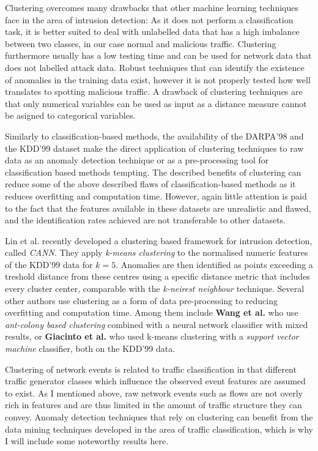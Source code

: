 \documentclass[a4paper,12pt,twoside]{report}
\begin{document}
Clustering overcomes many drawbacks that other machine learning techniques face in the area of intrusion detection: As it does not perform a classification task, it is better suited to deal with unlabelled data that has a high imbalance between two classes, in our case normal and malicious traffic. Clustering furthermore usually has a low testing time and can be used for network data that does not labelled attack data. Robust techniques that can identify the existence of anomalies in the training data exist, however it is not properly tested how well translates to spotting malicious traffic. A drawback of clustering techniques are that only numerical variables can be used as input as a distance measure cannot be asigned to categorical variables.


Similarly to classification-based methods, the availability of the DARPA'98 and the KDD'99 dataset make the direct application of clustering techniques to raw data as an anomaly detection technique or as a pre-processing tool for classification based methods tempting. The described benefits of clustering can reduce some of the above described flaws of classification-based methods as it reduces overfitting and computation time. However, again little attention is paid to the fact that the features available in these datasets are unrealistic and flawed, and the identification rates achieved are not transferable to other datasets.

Lin et al. \cite{lin2015cann} recently developed a clustering based framework for intrusion detection, called \textit{CANN}. They apply \textit{k-means clustering} to the normalised numeric features of the KDD'99 data for $k=5$. Anomalies are then identified as points exceeding a treshold distance from these centres using a specific distance metric that includes every cluster center, comparable with the \textit{k-neirest neighbour} technique. Several other authors use clustering as a form of data pre-processing to reducing overfitting and computation time. Among them  include \textbf{Wang et al.} \cite{wang2010new} who use \textit{ant-colony based clustering} combined with a neural network classifier with mixed results, or \textbf{Giacinto et al.} \cite{giacinto2008intrusion} who used k-means clustering with a \textit{support vector machine} classifier, both on the KDD'99 data.


Clustering of network events is related to traffic classification in that different traffic generator classes which influence the observed event features are assumed to exist. As I mentioned above, raw network events such as flows are not overly rich in features and are thus limited in the amount of traffic structure they can convey. Anomaly detection techniques that rely on clustering can benefit from the data mining techniques developed in the area of traffic classification, which is why I will include some noteworthy results here. 
\end{document}
